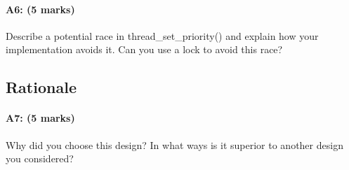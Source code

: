 \paragraph{A6: (5 marks)}
Describe a potential race in thread\_set\_priority() and explain how your implementation avoids it.  Can you use a lock to avoid this race?

\subsection{Rationale}
\paragraph{A7: (5 marks)}
Why did you choose this design?  In what ways is it superior to another design you considered?